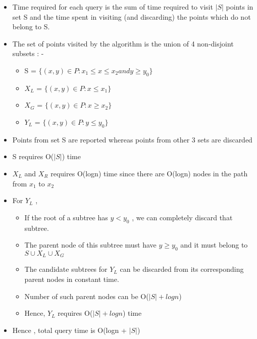\documentclass[11pt]{article}
\begin{document}
\begin{itemize}
\item Time required for each query is the sum of time required to visit $|S|$ points in set S and the time spent in visiting (and discarding) the points which do not belong to S. 
\item The set of points visited by the algorithm is the union of 4 non-disjoint subsets : -
\begin{itemize}
\item S = $\{ (x,y) \in P : x_1 \leq x \leq x_2 and y \geq y_0 \}$ 
\item $X_L$ = $\{ (x,y) \in P : x \leq x_1 \}$
\item $X_G$ = $\{ (x,y) \in P : x \geq x_2 \}$
\item $Y_L$ = $\{ (x,y) \in P : y \leq y_0 \}$
\end{itemize}
\item Points from set S are reported whereas points from other 3 sets are discarded
\item S requires O($|S|$) time
\item $X_L$ and $X_R$ requires O(logn) time since there are O(logn) nodes in the path from $x_1$ to $x_2$
\item For $Y_L$ ,
\begin{itemize}
\item If the root of a subtree has $y < y_0$ , we can completely discard that subtree.
\item The parent node of this subtree must have $y \geq y_0$ and it must belong to $S \cup X_L \cup X_G$
\item The candidate subtrees for $Y_L$ can be discarded from its corresponding parent nodes in constant time.
\item Number of such parent nodes can be O($|S| + logn$)
\item Hence, $Y_L$ requires O($|S| + logn$) time 
\end{itemize}
\item Hence , total query time is O(logn + $|S|$) 
\end{itemize}
  



\pagebreak
\end{document}
